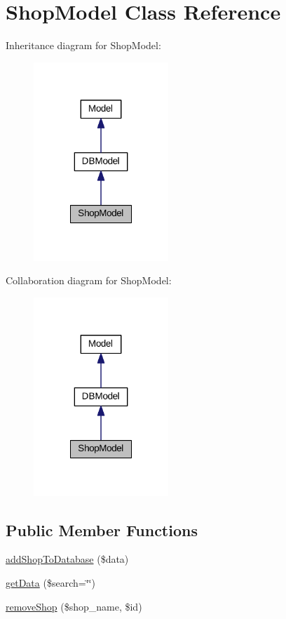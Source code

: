 \hypertarget{classShopModel}{\section{Shop\+Model Class Reference}
\label{classShopModel}
}


Inheritance diagram for Shop\+Model\+:\nopagebreak
\begin{figure}[H]
\begin{center}
\leavevmode
\includegraphics[width=144pt]{classShopModel__inherit__graph}
\end{center}
\end{figure}


Collaboration diagram for Shop\+Model\+:\nopagebreak
\begin{figure}[H]
\begin{center}
\leavevmode
\includegraphics[width=144pt]{classShopModel__coll__graph}
\end{center}
\end{figure}
\subsection*{Public Member Functions}
\begin{DoxyCompactItemize}
\item 
\hyperlink{classShopModel_a67653f592dcfd15e7c3e8a0262fb824b}{add\+Shop\+To\+Database} (\$data)
\item 
\hyperlink{classShopModel_a5c5c4b2e0ea0e4adb98e6e6dea5011b6}{get\+Data} (\$search=\char`\"{}\char`\"{})
\item 
\hyperlink{classShopModel_ae035aa872e97c08247d203f90e228fe2}{remove\+Shop} (\$shop\+\_\+name, \$id)
\end{DoxyCompactItemize}

